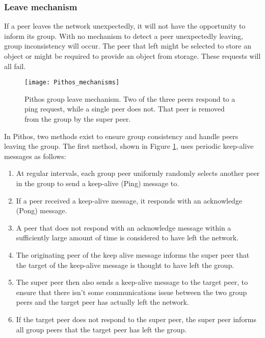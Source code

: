 \subsubsection{Leave mechanism}
\label{leave_design}

If a peer leaves the network unexpectedly, it will not have the opportunity to inform its group. With no mechanism to detect a peer unexpectedly leaving, group inconsistency will occur. The peer that left might be selected to store an object or might be required to provide an object from storage. These requests will all fail.

\begin{figure}[htbp]
 \centering
 \texttt{[image: Pithos\_mechanisms]}
 \caption{Pithos group leave mechanism. Two of the three peers respond to a ping request, while a single peer does not. That peer is removed from the group by the super peer.}
 \label{fig_pithos_leave}
\end{figure}

In Pithos, two methods exist to ensure group consistency and handle peers leaving the group. The first method, shown in Figure \ref{fig_pithos_leave}, uses periodic keep-alive messages as follows:
%
\begin{enumerate}
\item At regular intervals, each group peer uniformly randomly selects another peer in the group to send a keep-alive (Ping) message to.

\item If a peer received a keep-alive message, it responds with an acknowledge (Pong) message.

\item A peer that does not respond with an acknowledge message within a sufficiently large amount of time is considered to have left the network.

\item The originating peer of the keep alive message informs the super peer that the target of the keep-alive message is thought to have left the group.

\item The super peer then also sends a keep-alive message to the target peer, to ensure that there isn't some communications issue between the two group peers and the target peer has actually left the network.

\item If the target peer does not respond to the super peer, the super peer informs all group peers that the target peer has left the group.
\end{enumerate}

